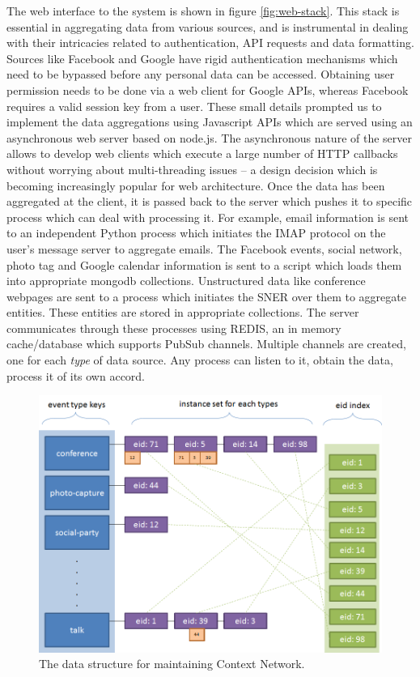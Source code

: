 The web interface to the system is shown in figure \ref{fig:web-stack}. This stack is essential in aggregating data from various sources, and is instrumental in dealing with their intricacies related to authentication, API requests and data formatting. Sources like Facebook and Google have rigid authentication mechanisms which need to be bypassed before any personal data can be accessed. Obtaining user permission needs to be done via a web client for Google APIs, whereas Facebook requires a valid session key from a user. These small details prompted us to implement the data aggregations using Javascript APIs which are served using an asynchronous web server based on node.js. The asynchronous nature of the server allows to develop web clients which execute a large number of HTTP callbacks without worrying about multi-threading issues -- a design decision which is becoming increasingly popular for web architecture. Once the data has been aggregated at the client, it is passed back to the server which pushes it to specific process which can deal with processing it. For example, email information is sent to an independent Python process which initiates the IMAP protocol on the user's message server to aggregate emails. The Facebook events, social network, photo tag and Google calendar information is sent to a script which loads them into appropriate mongodb collections. Unstructured data like conference webpages are sent to a process which initiates the SNER over them to aggregate entities. These entities are stored in appropriate collections. The server communicates through these processes using REDIS, an in memory cache/database which supports PubSub channels. Multiple channels are created, one for each \textit{type} of data source. Any process can listen to it, obtain the data, process it of its own accord.

\begin{figure}[h]
\centering
\includegraphics[width=\textwidth]{media/chapter4/adj-list.png}
\caption{The data structure for maintaining Context Network.}
\label{fig:adj-list}
\end{figure}

